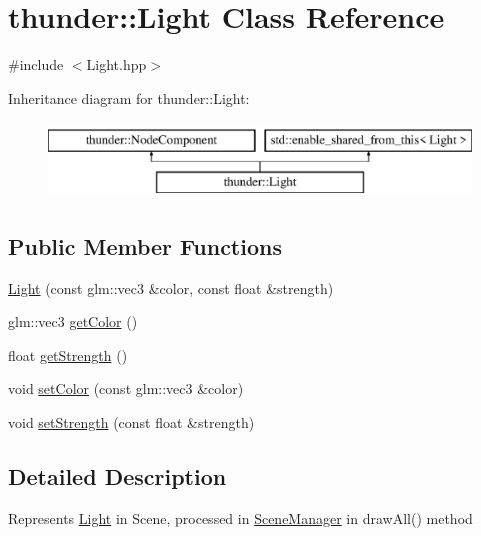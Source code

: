 \hypertarget{classthunder_1_1_light}{}\section{thunder\+:\+:Light Class Reference}
\label{classthunder_1_1_light}


{\ttfamily \#include $<$Light.\+hpp$>$}

Inheritance diagram for thunder\+:\+:Light\+:\begin{figure}[H]
\begin{center}
\leavevmode
\includegraphics[height=2.000000cm]{classthunder_1_1_light}
\end{center}
\end{figure}
\subsection*{Public Member Functions}
\begin{DoxyCompactItemize}
\item 
\mbox{\hyperlink{classthunder_1_1_light_a120bfc2c8eb595c452383e950c247dc7}{Light}} (const glm\+::vec3 \&color, const float \&strength)
\item 
glm\+::vec3 \mbox{\hyperlink{classthunder_1_1_light_a02a1a60ca26e2002da0e44108c5231dd}{get\+Color}} ()
\item 
float \mbox{\hyperlink{classthunder_1_1_light_afef27cd635c63f8e8b4cadb4d7b9800a}{get\+Strength}} ()
\item 
void \mbox{\hyperlink{classthunder_1_1_light_ae18169e11ef13011e6bb2d12e64596f5}{set\+Color}} (const glm\+::vec3 \&color)
\item 
void \mbox{\hyperlink{classthunder_1_1_light_a27add0c85ed86200826d63a1bea71b0a}{set\+Strength}} (const float \&strength)
\end{DoxyCompactItemize}


\subsection{Detailed Description}
Represents \mbox{\hyperlink{classthunder_1_1_light}{Light}} in Scene, processed in \mbox{\hyperlink{classthunder_1_1_scene_manager}{Scene\+Manager}} in draw\+All() method 

